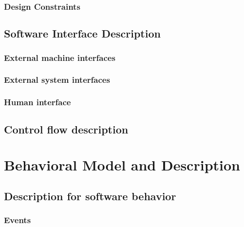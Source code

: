 \documentclass{article}
\begin{document}
\subsubsection{Design Constraints}

\subsection{Software Interface Description}

\subsubsection{External machine interfaces}

\subsubsection{External system interfaces}

\subsubsection{Human interface}

\subsection{Control flow description}

\section{ Behavioral Model and Description}

\subsection{Description for software behavior}

\subsubsection{Events}
\end{document}
